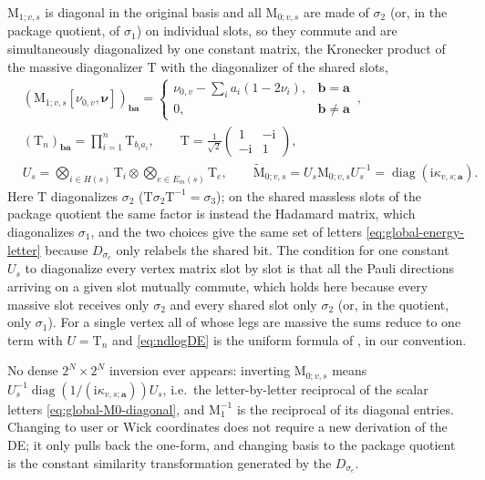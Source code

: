 \documentclass[11pt,a4paper]{article}
\numberwithin{table}{section}
\newcommand{\nn}{\nonumber}
\newcommand{\ii}{\mathrm i}
\newcommand{\diag}{\operatorname{diag}}
\begin{document}
$\text{M}_{1;v,s}$ is diagonal in the original basis and all $\text{M}_{0;v,s}$ are made of
$\sigma_2$ (or, in the package quotient, of $\sigma_1$) on individual slots, so they commute and
are simultaneously diagonalized by one constant matrix, the Kronecker product of the massive
diagonalizer $\text{T}$ with the diagonalizer of the shared slots,
\begin{align}
  &\left(\text{M}_{1;v,s}[\nu_{0,v},\bm{\nu}]\right)_{\bm{b}\bm{a}}= \begin{cases}
  \nu_{0,v}-\sum_i a_i(1-2\nu_i) , & \bm{b}=\bm{a} \\
  0, & \bm{b}\neq \bm{a}\end{cases}\, ,
  \label{eq:M-form}\\
  &\left(\text{T}_n\right)_{\bm{b}\bm{a}}=\prod_{i=1}^n \text{T}_{b_i a_i},
  \qquad
  \text{T}=\frac{1}{\sqrt{2}}\begin{pmatrix} 1 & -\ii \\ -\ii & 1 \end{pmatrix},
  \nn\\
  &U_s=\bigotimes_{i\in H(s)}\text{T}_i\otimes\bigotimes_{e\in E_m(s)}\text{T}_e,
  \qquad
  \widetilde{\text{M}}_{0;v,s}=U_s\text{M}_{0;v,s}U_s^{-1}=\diag(\ii\kappa_{v,s;\bm a}).
  \label{eq:global-M0-diagonal}
\end{align}
Here $\text{T}$ diagonalizes $\sigma_2$ ($\text{T}\sigma_2\text{T}^{-1}=\sigma_3$); on the shared
massless slots of the package quotient the same factor is instead the Hadamard matrix, which
diagonalizes $\sigma_1$, and the two choices give the same set of letters
\eqref{eq:global-energy-letter} because $D_{\sigma_e}$ only relabels the shared bit. The condition
for one constant $U_s$ to diagonalize every vertex matrix slot by slot is that all the Pauli
directions arriving on a given slot mutually commute, which holds here because every massive slot
receives only $\sigma_2$ and every shared slot only $\sigma_2$ (or, in the quotient, only
$\sigma_1$). For a
single vertex all of whose legs are massive the sums reduce to one term with $U=\text{T}_n$ and
\eqref{eq:ndlogDE} is the uniform formula of \cite{Chen:2024glu}, in our convention.

No dense $2^N\times2^N$ inversion ever appears: inverting $\text{M}_{0;v,s}$ means
$U_s^{-1}\diag(1/(\ii\kappa_{v,s;\bm a}))U_s$, i.e.\ the letter-by-letter reciprocal of the scalar
letters \eqref{eq:global-M0-diagonal}, and $\text{M}_{1}^{-1}$ is the reciprocal of its diagonal
entries. Changing to user or Wick coordinates does not require a new derivation of the DE; it only
pulls back the one-form, and changing basis to the package quotient is the constant similarity
transformation generated by the $D_{\sigma_e}$.
\end{document}
